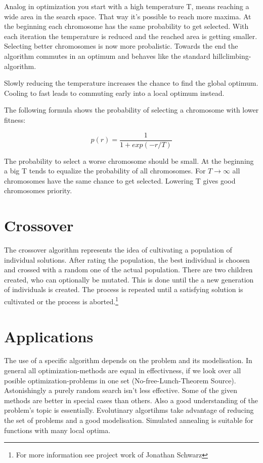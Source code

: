 \documentclass[10pt,a4paper,DIV=11]{scrreprt}
\begin{document}
Analog in optimization you start with a high temperature T, means reaching a wide area in the search space. That way it's possible to reach more maxima. At the beginning each chromosome has the same probability to get selected. With each iteration the temperature is reduced and the reached area is getting smaller. Selecting better chromosomes is now more probalistic.
Towards the end the algorithm commutes in an optimum and behaves like the standard hillclimbing-algorithm.

Slowly reducing the temperature increases the chance to find the global optimum. Cooling to fast leads to commuting early into a local optimum instead.

The following formula shows the probability of selecting a chromosome with lower fitness:

\begin{equation}
p(r) = \frac{1}{1+exp(-r/T)}
\end{equation} 

The probability to select a worse chromosome should be small.
At the beginning a big T tends to equalize the probability of all chromosomes. For $T \to \infty$ all chromosomes have the same chance to get selected. Lowering T gives good chromosomes priority.


\section{Crossover}
The crossover algorithm represents the idea of cultivating a population of individual solutions. After rating the population, the best individual is choosen and crossed with a random one of the actual population. There are two children created, who can optionally be mutated. This is done until the a new generation of individuals is created.
The process is repeated until a satisfying solution is cultivated or the process is aborted.\footnote{For more information see project work of Jonathan Schwarz}

\section{Applications}
The use of a specific algorithm depends on the problem and its modelisation. In general all optimization-methods are equal in effectivness, if we look over all posible optimization-problems in one set (No-free-Lunch-Theorem Source). Astonishingly a purely random search isn't less effective.
Some of the given methods are better in special cases than others. Also a good understanding of the problem's topic is essentially. Evolutinary algortihms take advantage of reducing the set of problems and a good modelisation.
Simulated annealing is suitable for functions with many local optima.
\end{document}
